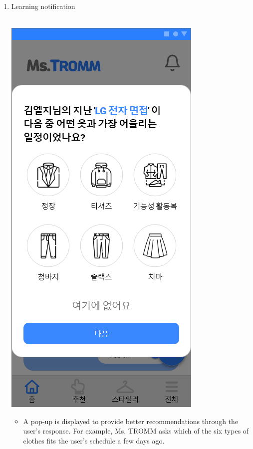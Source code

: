 \documentclass[conference]{IEEEtran}
\begin{document}
\begin{enumerate}
    \item Learning notification \\ \\
        \centerline{\includegraphics[scale=0.32]{assets/학습 팝업1.png}}
        \begin{itemize}
            \item[] A pop-up is displayed to provide better recommendations through the user's response. For example, Ms. TROMM asks which of the six types of clothes fits the user's schedule a few days ago.\\ \\ \\ \\ 
        \end{itemize}
        

\end{enumerate}
\end{document}
